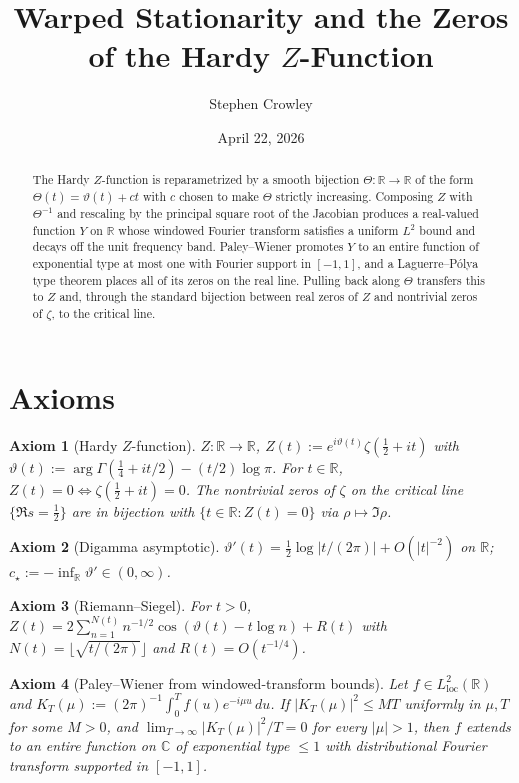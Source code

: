 \documentclass[11pt,a4paper]{article}
\title{Warped Stationarity and the Zeros of the Hardy $Z$-Function}
\author{Stephen Crowley}
\date{April 22, 2026}
\theoremstyle{plain}
\newtheorem{axiom}{Axiom}
\theoremstyle{definition}
\newcommand{\R}{\mathbb{R}}
\newcommand{\C}{\mathbb{C}}
\begin{document}
\maketitle

\begin{abstract}
The Hardy $Z$-function is reparametrized by a smooth bijection $\Theta:\R\to\R$ of the form $\Theta(t)=\vartheta(t)+ct$ with $c$ chosen to make $\Theta$ strictly increasing. Composing $Z$ with $\Theta^{-1}$ and rescaling by the principal square root of the Jacobian produces a real-valued function $Y$ on $\R$ whose windowed Fourier transform satisfies a uniform $L^2$ bound and decays off the unit frequency band. Paley--Wiener promotes $Y$ to an entire function of exponential type at most one with Fourier support in $[-1,1]$, and a Laguerre--P\'olya type theorem places all of its zeros on the real line. Pulling back along $\Theta$ transfers this to $Z$ and, through the standard bijection between real zeros of $Z$ and nontrivial zeros of $\zeta$, to the critical line.
\end{abstract}

\section{Axioms}

\begin{axiom}[Hardy $Z$-function]\label{ax:Z}
$Z:\R\to\R$, $Z(t):=e^{i\vartheta(t)}\zeta(\tfrac12+it)$ with $\vartheta(t):=\arg\Gamma(\tfrac14+it/2)-(t/2)\log\pi$. For $t\in\R$, $Z(t)=0\iff\zeta(\tfrac12+it)=0$. The nontrivial zeros of $\zeta$ on the critical line $\{\Re s=\tfrac12\}$ are in bijection with $\{t\in\R:Z(t)=0\}$ via $\rho\mapsto\Im\rho$.
\end{axiom}

\begin{axiom}[Digamma asymptotic]\label{ax:dig}
$\vartheta'(t)=\tfrac12\log|t/(2\pi)|+O(|t|^{-2})$ on $\R$; $c_\star:=-\inf_\R\vartheta'\in(0,\infty)$.
\end{axiom}

\begin{axiom}[Riemann--Siegel]\label{ax:RS}
For $t>0$, $Z(t)=2\sum_{n=1}^{N(t)}n^{-1/2}\cos(\vartheta(t)-t\log n)+R(t)$ with $N(t)=\lfloor\sqrt{t/(2\pi)}\rfloor$ and $R(t)=O(t^{-1/4})$.
\end{axiom}

\begin{axiom}[Paley--Wiener from windowed-transform bounds]\label{ax:PW}
Let $f\in L^2_{\mathrm{loc}}(\R)$ and $K_T(\mu):=(2\pi)^{-1}\int_0^T f(u)e^{-i\mu u}\,du$. If $|K_T(\mu)|^2\le MT$ uniformly in $\mu,T$ for some $M>0$, and $\lim_{T\to\infty}|K_T(\mu)|^2/T=0$ for every $|\mu|>1$, then $f$ extends to an entire function on $\C$ of exponential type $\le 1$ with distributional Fourier transform supported in $[-1,1]$.
\end{axiom}
\end{document}
